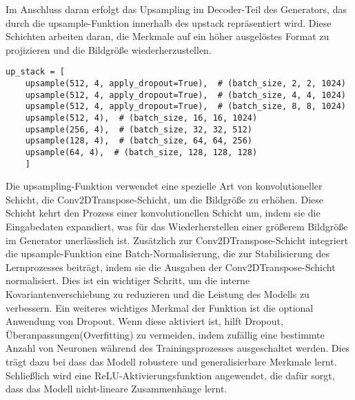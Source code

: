 Im Anschluss daran erfolgt das Upsampling im Decoder-Teil des Generators, das durch die upsample-Funktion innerhalb des upstack repräsentiert wird. Diese Schichten arbeiten daran, die Merkmale auf ein höher ausgelöstes Format zu projizieren und die Bildgröße wiederherzustellen.

\begin{lstlisting}[language=pyhaff, caption={Upsampling-Schritt}, label={cod:Pix2PixGAN Generator}]
	up_stack = [
	upsample(512, 4, apply_dropout=True),  # (batch_size, 2, 2, 1024)
	upsample(512, 4, apply_dropout=True),  # (batch_size, 4, 4, 1024)
	upsample(512, 4, apply_dropout=True),  # (batch_size, 8, 8, 1024)
	upsample(512, 4),  # (batch_size, 16, 16, 1024)
	upsample(256, 4),  # (batch_size, 32, 32, 512)
	upsample(128, 4),  # (batch_size, 64, 64, 256)
	upsample(64, 4),  # (batch_size, 128, 128, 128)
	]
\end{lstlisting}

Die upsampling-Funktion verwendet eine spezielle Art von  konvolutioneller Schicht, die Conv2DTranspose-Schicht, um die Bildgröße zu erhöhen. Diese Schicht kehrt den Prozess einer konvolutionellen Schicht um, indem sie die Eingabedaten expandiert, was für das Wiederherstellen einer größerem Bildgröße im Generator unerlässlich ist. Zusätzlich zur Conv2DTranspose-Schicht integriert die upsample-Funktion eine Batch-Normalisierung, die zur Stabilisierung des Lernprozesses beiträgt, indem sie die Ausgaben der Conv2DTranspose-Schicht normalisiert. Dies ist ein wichtiger Schritt, um die interne Kovariantenverschiebung zu reduzieren und die Leistung des Modells zu verbessern. Ein weiteres wichtiges Merkmal der Funktion ist die optional Anwendung von Dropout. Wenn diese aktiviert ist, hilft Dropout, Überanpassungen(Overfitting) zu vermeiden, indem zufällig eine bestimmte Anzahl von Neuronen während des Trainingsprozesses ausgeschaltet werden. Dies trägt dazu bei dass das Modell robustere und generalisierbare Merkmale lernt. Schließlich wird eine ReLU-Aktivierungsfunktion angewendet, die dafür sorgt, dass das Modell nicht-lineare Zusammenhänge lernt. 

